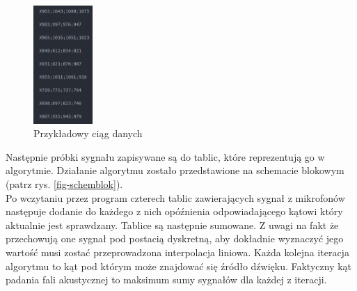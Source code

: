 \documentclass[eng,printmode]{mgr}
\begin{document}
 \begin{figure}[!ht]

    \centering

  \includegraphics[width=0.2\textwidth, angle=0]{dane.png}

    \caption{Przykładowy ciąg danych}
 \label{fig-data}
    

\end{figure}
Następnie próbki sygnału zapisywane są do tablic, które reprezentują go w algorytmie. Działanie algorytmu zostało przedstawione na schemacie blokowym (patrz rys. \ref{fig-schemblok}).\\ Po wczytaniu przez program czterech tablic zawierających sygnał z mikrofonów następuje dodanie do każdego z nich opóźnienia odpowiadającego kątowi który aktualnie jest sprawdzany. Tablice są następnie sumowane. Z uwagi na fakt że przechowują one sygnał pod postacią dyskretną, aby dokładnie wyznaczyć jego wartość musi zostać przeprowadzona interpolacja liniowa. Każda kolejna iteracja algorytmu to kąt pod którym może znajdować się źródło dźwięku. Faktyczny kąt padania fali akustycznej to maksimum sumy sygnałów dla każdej z iteracji. 
\end{document}
